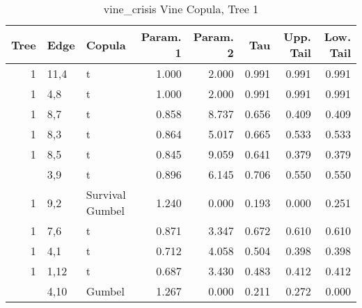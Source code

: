 \begin{table}

\caption{vine_crisis Vine Copula, Tree 1}
\centering
\begin{tabular}[t]{rllrrrrr}
\toprule
Tree & Edge & Copula & Param. 1 & Param. 2 & Tau & Upp. Tail & Low. Tail\\
\midrule
1 & 11,4 & t & 1.000 & 2.000 & 0.991 & 0.991 & 0.991\\
1 & 4,8 & t & 1.000 & 2.000 & 0.991 & 0.991 & 0.991\\
1 & 8,7 & t & 0.858 & 8.737 & 0.656 & 0.409 & 0.409\\
1 & 8,3 & t & 0.864 & 5.017 & 0.665 & 0.533 & 0.533\\
1 & 8,5 & t & 0.845 & 9.059 & 0.641 & 0.379 & 0.379\\
\addlinespace
1 & 3,9 & t & 0.896 & 6.145 & 0.706 & 0.550 & 0.550\\
1 & 9,2 & Survival Gumbel & 1.240 & 0.000 & 0.193 & 0.000 & 0.251\\
1 & 7,6 & t & 0.871 & 3.347 & 0.672 & 0.610 & 0.610\\
1 & 4,1 & t & 0.712 & 4.058 & 0.504 & 0.398 & 0.398\\
1 & 1,12 & t & 0.687 & 3.430 & 0.483 & 0.412 & 0.412\\
\addlinespace
1 & 4,10 & Gumbel & 1.267 & 0.000 & 0.211 & 0.272 & 0.000\\
\bottomrule
\end{tabular}
\end{table}

